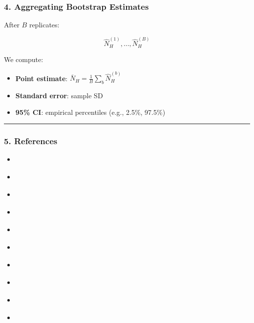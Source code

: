 \documentclass[
  12pt,
  letterpaper,
  DIV=11,
  numbers=noendperiod]{scrartcl}
\theoremstyle{plain}
\theoremstyle{definition}
\begin{document}
\subsubsection{4. Aggregating Bootstrap
Estimates}\label{aggregating-bootstrap-estimates}

After \(B\) replicates:

\[\hat{N}_H^{(1)}, \dots, \hat{N}_H^{(B)}\]

We compute:

\begin{itemize}
\item
  \textbf{Point estimate}:
  \(\bar{N}_H = \frac{1}{B} \sum_b \hat{N}_H^{(b)}\)
\item
  \textbf{Standard error}: sample SD
\item
  \textbf{95\% CI}: empirical percentiles (e.g., 2.5\%, 97.5\%)
\end{itemize}

\begin{center}\rule{0.5\linewidth}{0.5pt}\end{center}

\subsubsection{5. References}\label{references-1}

\begin{itemize}
\item
  \textcite{feeh16-generaling}
\item
  \textcite{salf06-variance}
\item
  \textcite{gile11-inference}
\item
  \textcite{volz08-rds}
\item
  \textcite{malt15-estimating}
\item
  \textcite{yauc22-neighboot}
\item
  \textcite{weir12-comparison}
\item
  \textcite{salg06-variance}
\item
  \textcite{rust96-rescaled}
\item
  \textcite{rao88-resampling}
\end{itemize}
\end{document}
